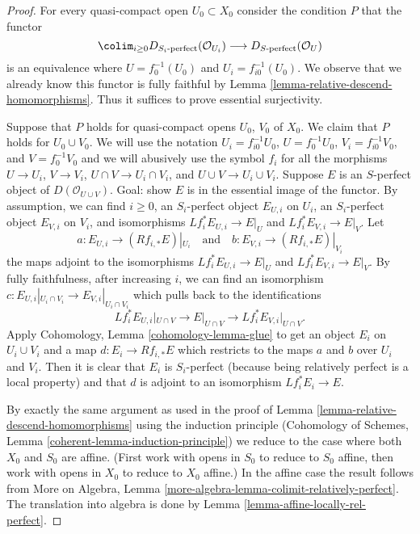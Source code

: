 \begin{proof}
For every quasi-compact open $U_0 \subset X_0$ consider the condition $P$
that the functor
$$
\colim_{i \geq 0} D_{S_i\text{-perfect}}(\mathcal{O}_{U_i})
\longrightarrow
D_{S\text{-perfect}}(\mathcal{O}_U)
$$
is an equivalence where $U = f_0^{-1}(U_0)$ and $U_i = f_{i0}^{-1}(U_0)$.
We observe that we already know this functor is fully faithful
by Lemma \ref{lemma-relative-descend-homomorphisms}. Thus it suffices to prove
essential surjectivity.

\medskip\noindent
Suppose that $P$ holds for quasi-compact opens $U_0$, $V_0$ of $X_0$.
We claim that $P$ holds for $U_0 \cup V_0$. We will use the notation
$U_i = f_{i0}^{-1}U_0$, $U = f_0^{-1}U_0$, $V_i = f_{i0}^{-1}V_0$,
and $V = f_0^{-1}V_0$ and we will abusively use the symbol
$f_i$ for all the morphisms $U \to U_i$, $V \to V_i$,
$U \cap V \to U_i \cap V_i$, and $U \cup V \to U_i \cup V_i$.
Suppose $E$ is an $S$-perfect object of $D(\mathcal{O}_{U \cup V})$.
Goal: show $E$ is in the essential image of the functor.
By assumption,
we can find $i \geq 0$, an $S_i$-perfect object $E_{U, i}$ on $U_i$,
an $S_i$-perfect object $E_{V, i}$ on $V_i$, and
isomorphisms $Lf_i^*E_{U, i} \to E|_U$ and $Lf_i^*E_{V, i} \to E|_V$.
Let
$$
a : E_{U, i} \to (Rf_{i, *}E)|_{U_i}
\quad\text{and}\quad
b : E_{V, i} \to (Rf_{i, *}E)|_{V_i}
$$
the maps adjoint to the isomorphisms $Lf_i^*E_{U, i} \to E|_U$
and $Lf_i^*E_{V, i} \to E|_V$.
By fully faithfulness, after increasing $i$,
we can find an isomorphism
$c : E_{U, i}|_{U_i \cap V_i} \to E_{V, i}|_{U_i \cap V_i}$
which pulls back to the identifications 
$$
Lf_i^*E_{U, i}|_{U \cap V} \to E|_{U \cap V} \to Lf_i^*E_{V, i}|_{U \cap V}.
$$
Apply Cohomology, Lemma \ref{cohomology-lemma-glue}
to get an object $E_i$ on $U_i \cup V_i$ and a map $d : E_i \to Rf_{i, *}E$
which restricts to the maps $a$ and $b$ over $U_i$ and $V_i$.
Then it is clear that $E_i$ is $S_i$-perfect (because being
relatively perfect is a local property) and that
$d$ is adjoint to an isomorphism $Lf_i^*E_i \to E$.

\medskip\noindent
By exactly the same argument as used in
the proof of Lemma \ref{lemma-relative-descend-homomorphisms}
using the induction principle
(Cohomology of Schemes, Lemma \ref{coherent-lemma-induction-principle})
we reduce to the case where both $X_0$ and $S_0$
are affine. (First work with opens in $S_0$ to reduce to
$S_0$ affine, then work with opens in $X_0$ to reduce to
$X_0$ affine.) In the affine case the result follows from
More on Algebra, Lemma \ref{more-algebra-lemma-colimit-relatively-perfect}.
The translation into algebra is done by
Lemma \ref{lemma-affine-locally-rel-perfect}.
\end{proof}

